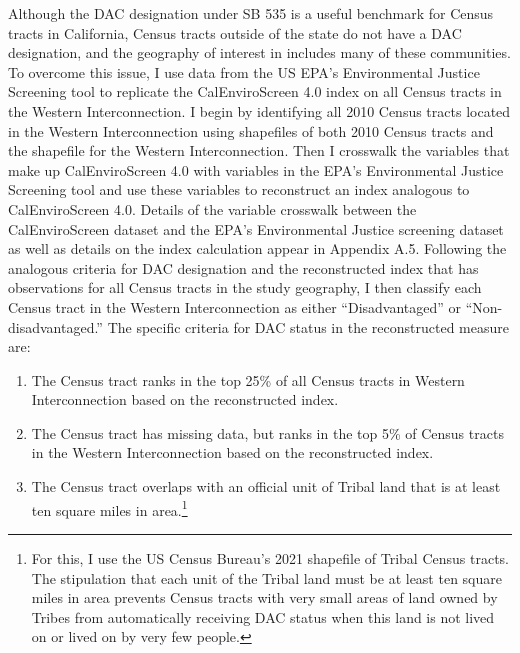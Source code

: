 Although the DAC designation under SB 535 is a useful benchmark for Census tracts in California, Census tracts outside of the state do not have a DAC designation, and the geography of interest in includes many of these communities. To overcome this issue, I use data from the US EPA's Environmental Justice Screening tool to replicate the CalEnviroScreen 4.0 index on all Census tracts in the Western Interconnection. I begin by identifying all 2010 Census tracts located in the Western Interconnection using shapefiles of both 2010 Census tracts and the shapefile for the Western Interconnection. Then I crosswalk the variables that make up CalEnviroScreen 4.0 with variables in the EPA's Environmental Justice Screening tool and use these variables to reconstruct an index analogous to CalEnviroScreen 4.0. Details of the variable crosswalk between the CalEnviroScreen dataset and the EPA's Environmental Justice screening dataset as well as details on the index calculation appear in Appendix A.5. Following the analogous criteria for DAC designation and the reconstructed index that has observations for all Census tracts in the study geography, I then classify each Census tract in the Western Interconnection as either ``Disadvantaged'' or ``Non-disadvantaged.'' The specific criteria for DAC status in the reconstructed measure are:
\begin{enumerate}
    \item The Census tract ranks in the top 25\% of all Census tracts in Western Interconnection based on the reconstructed index.
    \item The Census tract has missing data, but ranks in the top 5\% of Census tracts in the Western Interconnection based on the reconstructed index. 
    \item The Census tract overlaps with an official unit of Tribal land that is at least ten square miles in area.\footnote{For this, I use the US Census Bureau's 2021 shapefile of Tribal Census tracts. The stipulation that each unit of the Tribal land must be at least ten square miles in area prevents Census tracts with very small areas of land owned by Tribes from automatically receiving DAC status when this land is not lived on or lived on by very few people.}
\end{enumerate}
